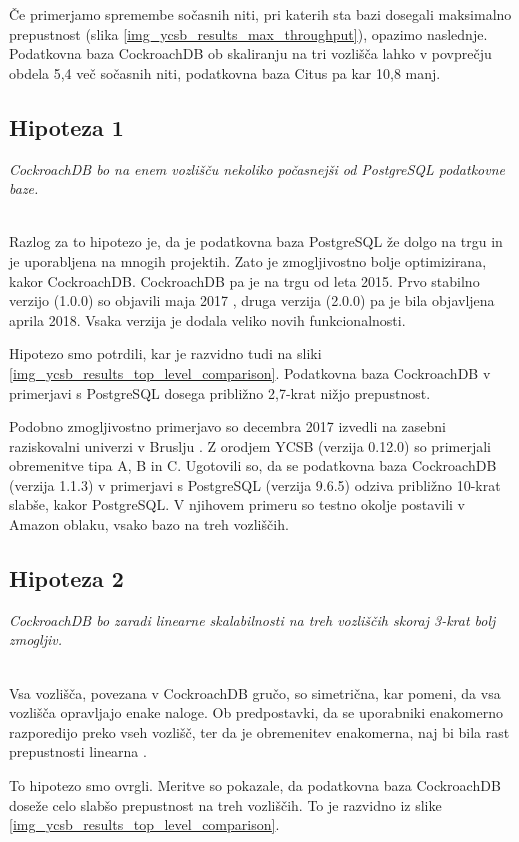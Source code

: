 \documentclass[a4paper, 12pt]{book}
\begin{document}
Če primerjamo spremembe sočasnih niti, pri katerih sta bazi dosegali maksimalno prepustnost (slika \ref{img_ycsb_results_max_throughput}), opazimo naslednje. Podatkovna baza CockroachDB ob skaliranju na tri vozlišča lahko v povprečju obdela 5,4 več sočasnih niti, podatkovna baza Citus pa kar 10,8 manj.

\subsection{Hipoteza 1}
\textit{CockroachDB bo na enem vozlišču nekoliko počasnejši od PostgreSQL podatkovne baze.}

\ \\
Razlog za to hipotezo je, da je podatkovna baza PostgreSQL že dolgo na trgu \cite{Postgres-first-release} in je uporabljena na mnogih projektih. Zato je zmogljivostno bolje optimizirana, kakor CockroachDB. CockroachDB pa je na trgu od leta 2015. Prvo stabilno verzijo (1.0.0) so objavili maja 2017 \cite{CRDB-2017}, druga verzija (2.0.0) pa je bila objavljena aprila 2018. Vsaka verzija je dodala veliko novih funkcionalnosti.

Hipotezo smo potrdili, kar je razvidno tudi na sliki \ref{img_ycsb_results_top_level_comparison}. Podatkovna baza CockroachDB v primerjavi s PostgreSQL dosega približno 2,7-krat nižjo prepustnost.

Podobno zmogljivostno primerjavo so decembra 2017 izvedli na zasebni raziskovalni univerzi v Bruslju \cite{CRDB-2017}. Z orodjem YCSB (verzija 0.12.0) so primerjali obremenitve tipa A, B in C. Ugotovili so, da se podatkovna baza CockroachDB (verzija 1.1.3) v primerjavi s PostgreSQL (verzija 9.6.5) odziva približno 10-krat slabše, kakor PostgreSQL. V njihovem primeru so testno okolje postavili v Amazon oblaku, vsako bazo na treh vozliščih.

\subsection{Hipoteza 2}
\textit{CockroachDB bo zaradi linearne skalabilnosti na treh vozliščih skoraj 3-krat bolj zmogljiv.}

\ \\
Vsa vozlišča, povezana v CockroachDB gručo, so simetrična, kar pomeni, da vsa vozlišča opravljajo enake naloge. Ob predpostavki, da se uporabniki enakomerno razporedijo preko vseh vozlišč, ter da je obremenitev enakomerna, naj bi bila rast prepustnosti linearna \cite{CRDB-design}.

To hipotezo smo ovrgli. Meritve so pokazale, da podatkovna baza CockroachDB doseže celo slabšo prepustnost na treh vozliščih. To je razvidno iz slike \ref{img_ycsb_results_top_level_comparison}.
\end{document}
